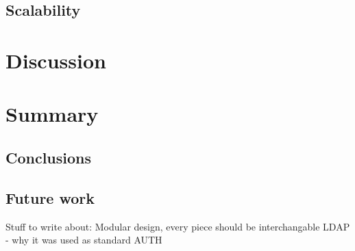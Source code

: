 \documentclass[a4paper,12pt]{article}
\begin{document}
\subsection{Scalability}

\section{Discussion}

\section{Summary}
\subsection{Conclusions}

\subsection{Future work}

Stuff to write about:
Modular design, every piece should be interchangable
LDAP - why it was used as standard AUTH


\newpage


\end{document}
